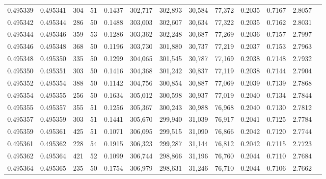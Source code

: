 \begin{tabular}{rrrrrrrrrrrrr}
0.495339 & 0.495341 &   304 &  51 &                                     0.1437 & 302,717 & 302,893 &  30,584 &  77,372 & 0.2035 & 0.7167 & 2.8057 \\
0.495342 & 0.495344 &   286 &  50 &                                     0.1488 & 303,003 & 302,607 &  30,634 &  77,322 & 0.2035 & 0.7162 & 2.8031 \\
0.495344 & 0.495346 &   359 &  53 &                                     0.1286 & 303,362 & 302,248 &  30,687 &  77,269 & 0.2036 & 0.7157 & 2.7997 \\
0.495346 & 0.495348 &   368 &  50 &                                     0.1196 & 303,730 & 301,880 &  30,737 &  77,219 & 0.2037 & 0.7153 & 2.7963 \\
0.495348 & 0.495350 &   335 &  50 &                                     0.1299 & 304,065 & 301,545 &  30,787 &  77,169 & 0.2038 & 0.7148 & 2.7932 \\
0.495350 & 0.495351 &   303 &  50 &                                     0.1416 & 304,368 & 301,242 &  30,837 &  77,119 & 0.2038 & 0.7144 & 2.7904 \\
0.495352 & 0.495354 &   388 &  50 &                                     0.1142 & 304,756 & 300,854 &  30,887 &  77,069 & 0.2039 & 0.7139 & 2.7868 \\
0.495354 & 0.495355 &   256 &  50 &                                     0.1634 & 305,012 & 300,598 &  30,937 &  77,019 & 0.2040 & 0.7134 & 2.7844 \\
0.495355 & 0.495357 &   355 &  51 &                                     0.1256 & 305,367 & 300,243 &  30,988 &  76,968 & 0.2040 & 0.7130 & 2.7812 \\
0.495357 & 0.495359 &   303 &  51 &                                     0.1441 & 305,670 & 299,940 &  31,039 &  76,917 & 0.2041 & 0.7125 & 2.7784 \\
0.495359 & 0.495361 &   425 &  51 &                                     0.1071 & 306,095 & 299,515 &  31,090 &  76,866 & 0.2042 & 0.7120 & 2.7744 \\
0.495361 & 0.495362 &   228 &  54 &                                     0.1915 & 306,323 & 299,287 &  31,144 &  76,812 & 0.2042 & 0.7115 & 2.7723 \\
0.495362 & 0.495364 &   421 &  52 &                                     0.1099 & 306,744 & 298,866 &  31,196 &  76,760 & 0.2044 & 0.7110 & 2.7684 \\
0.495364 & 0.495365 &   235 &  50 &                                     0.1754 & 306,979 & 298,631 &  31,246 &  76,710 & 0.2044 & 0.7106 & 2.7662 \\

\end{tabular}
